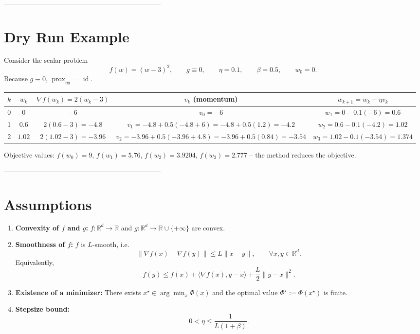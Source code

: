 \documentclass{article}
\newcommand{\prox}{\operatorname{prox}}
\newcommand{\R}{\mathbb{R}}
\begin{document}
---------------------------------------------------------------------

\section*{Dry Run Example}
Consider the scalar problem  
\[
f(w)=(w-3)^2,\qquad g\equiv0,\qquad \eta=0.1,\qquad \beta=0.5,\qquad w_0=0.
\]
Because $g\equiv0$, $\prox_{\eta g}= \operatorname{id}$.

\begin{center}
\begin{tabular}{c|c|c|c|c}
$k$ & $w_k$ & $\nabla f(w_k)=2(w_k-3)$ & $v_k$ (momentum) & $w_{k+1}=w_k-\eta v_k$ \\ \hline
0 & $0$ & $-6$ & $v_0=-6$ & $w_1=0-0.1(-6)=0.6$ \\[2pt]
1 & $0.6$ & $2(0.6-3)=-4.8$ & $v_1=-4.8+0.5(-4.8+6)= -4.8+0.5(1.2)=-4.2$ &
$w_2=0.6-0.1(-4.2)=1.02$ \\[2pt]
2 & $1.02$ & $2(1.02-3)=-3.96$ & $v_2=-3.96+0.5(-3.96+4.8)= -3.96+0.5(0.84)= -3.54$ &
$w_3=1.02-0.1(-3.54)=1.374$ 
\end{tabular}
\end{center}
Objective values: $f(w_0)=9$, $f(w_1)=5.76$, $f(w_2)=3.9204$, $f(w_3)=2.777$ – the method reduces the objective.

---------------------------------------------------------------------

\section*{Assumptions}
\begin{enumerate}[label=(A\arabic*)]
\item \label{A1} \textbf{Convexity of $f$ and $g$:}  
$f:\R^{d}\to\R$ and $g:\R^{d}\to\R\cup\{+\infty\}$ are convex.
\item \label{A2} \textbf{Smoothness of $f$:}  
$f$ is $L$‑smooth, i.e.
\[
\|\nabla f(x)-\nabla f(y)\|\le L\|x-y\|,\qquad\forall x,y\in\R^{d}.
\]
Equivalently,
\[
f(y)\le f(x)+\langle\nabla f(x),y-x\rangle+\frac{L}{2}\|y-x\|^{2}. \tag{1}
\]
\item \label{A3} \textbf{Existence of a minimizer:}  
There exists $x^{\star}\in\arg\min_{x}\Phi(x)$ and the optimal value $\Phi^{\star}:=\Phi(x^{\star})$ is finite.
\item \label{A4} \textbf{Stepsize bound:}  
\[
0<\eta\le\frac{1}{L(1+\beta)}.
\]
\end{enumerate}
\end{document}
